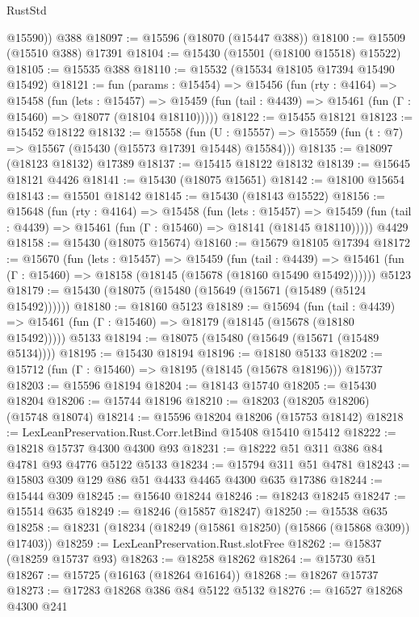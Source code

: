 \begin{lexlean}{RustStd}
\begin{coremodule}
        @15590))
    @388
@18097 := @15596 (@18070 (@15447 @388))
@18100 := @15509 (@15510 @388) @17391
@18104 := @15430 (@15501 (@18100 @15518) @15522)
@18105 := @15535 @388
@18110 := @15532 (@15534 @18105 @17394 @15490 @15492)
@18121 := fun (params : @15454) =>
  @15456
    (fun (rty : @4164) =>
    @15458
      (fun (lets : @15457) =>
      @15459 (fun (tail : @4439) => @15461 (fun (Γ : @15460) => @18077 (@18104 @18110)))))
@18122 := @15455 @18121
@18123 := @15452 @18122
@18132 := @15558
    (fun (U : @15557) => @15559 (fun (t : @7) => @15567 (@15430 (@15573 @17391 @15448) @15584)))
@18135 := @18097 (@18123 @18132) @17389
@18137 := @15415 @18122 @18132
@18139 := @15645 @18121 @4426
@18141 := @15430 (@18075 @15651)
@18142 := @18100 @15654
@18143 := @15501 @18142
@18145 := @15430 (@18143 @15522)
@18156 := @15648
    (fun (rty : @4164) =>
    @15458
      (fun (lets : @15457) =>
      @15459 (fun (tail : @4439) => @15461 (fun (Γ : @15460) => @18141 (@18145 @18110)))))
    @4429
@18158 := @15430 (@18075 @15674)
@18160 := @15679 @18105 @17394
@18172 := @15670
    (fun (lets : @15457) =>
    @15459
      (fun (tail : @4439) =>
      @15461 (fun (Γ : @15460) => @18158 (@18145 (@15678 (@18160 @15490 @15492))))))
    @5123
@18179 := @15430 (@18075 (@15480 (@15649 (@15671 (@15489 (@5124 @15492))))))
@18180 := @18160 @5123
@18189 := @15694
    (fun (tail : @4439) => @15461 (fun (Γ : @15460) => @18179 (@18145 (@15678 (@18180 @15492)))))
    @5133
@18194 := @18075 (@15480 (@15649 (@15671 (@15489 @5134))))
@18195 := @15430 @18194
@18196 := @18180 @5133
@18202 := @15712 (fun (Γ : @15460) => @18195 (@18145 (@15678 @18196))) @15737
@18203 := @15596 @18194
@18204 := @18143 @15740
@18205 := @15430 @18204
@18206 := @15744 @18196
@18210 := @18203 (@18205 @18206) (@15748 @18074)
@18214 := @15596 @18204 @18206 (@15753 @18142)
@18218 := LexLeanPreservation.Rust.Corr.letBind @15408 @15410 @15412
@18222 := @18218 @15737 @4300 @4300 @93
@18231 := @18222 @51 @311 @386 @84 @4781 @93 @4776 @5122 @5133
@18234 := @15794 @311 @51 @4781
@18243 := @15803 @309 @129 @86 @51 @4433 @4465 @4300 @635 @17386
@18244 := @15444 @309
@18245 := @15640 @18244
@18246 := @18243 @18245
@18247 := @15514 @635
@18249 := @18246 (@15857 @18247)
@18250 := @15538 @635
@18258 := @18231 (@18234 (@18249 (@15861 @18250) (@15866 (@15868 @309)) @17403))
@18259 := LexLeanPreservation.Rust.slotFree
@18262 := @15837 (@18259 @15737 @93)
@18263 := @18258 @18262
@18264 := @15730 @51
@18267 := @15725 (@16163 (@18264 @16164))
@18268 := @18267 @15737
@18273 := @17283 @18268 @386 @84 @5122 @5132
@18276 := @16527 @18268 @4300 @241

\end{coremodule}
\end{lexlean}
